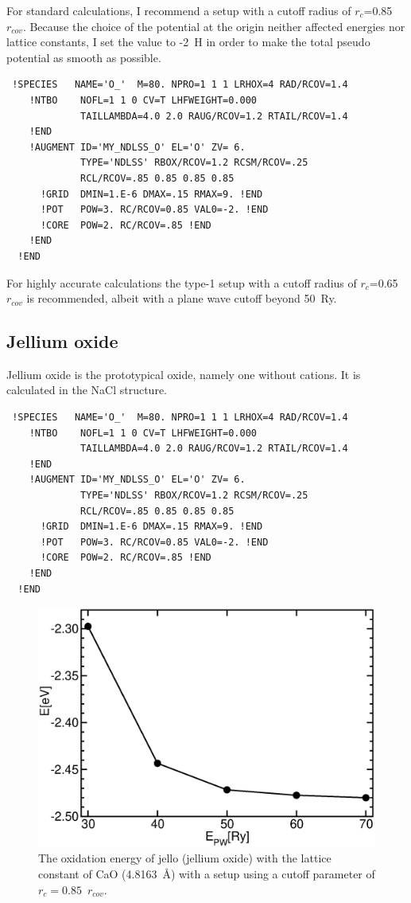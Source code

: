 \documentclass[11pt,a4paper]{report}
\begin{document}
For standard calculations, I recommend a setup with a cutoff radius of
$r_c$=0.85~$r_{cov}$. Because the choice of the potential at the
origin neither affected energies nor lattice constants, I set the
value to -2~H in order to make the total pseudo potential as smooth
as possible.
\begin{verbatim}
 !SPECIES   NAME='O_'  M=80. NPRO=1 1 1 LRHOX=4 RAD/RCOV=1.4
    !NTBO    NOFL=1 1 0 CV=T LHFWEIGHT=0.000
             TAILLAMBDA=4.0 2.0 RAUG/RCOV=1.2 RTAIL/RCOV=1.4 
    !END 
    !AUGMENT ID='MY_NDLSS_O' EL='O' ZV= 6.
             TYPE='NDLSS' RBOX/RCOV=1.2 RCSM/RCOV=.25
             RCL/RCOV=.85 0.85 0.85 0.85
      !GRID  DMIN=1.E-6 DMAX=.15 RMAX=9. !END
      !POT   POW=3. RC/RCOV=0.85 VAL0=-2. !END
      !CORE  POW=2. RC/RCOV=.85 !END
    !END
  !END
\end{verbatim}

 For highly accurate calculations the
type-1 setup with a cutoff radius of $r_c$=0.65~$r_{cov}$ is
recommended, albeit with a plane wave cutoff beyond 50~Ry.


\subsection{Jellium oxide}
Jellium oxide is the prototypical oxide, namely one without
cations. It is calculated in the NaCl structure.
{\tiny\begin{verbatim}
 !SPECIES   NAME='O_'  M=80. NPRO=1 1 1 LRHOX=4 RAD/RCOV=1.4
    !NTBO    NOFL=1 1 0 CV=T LHFWEIGHT=0.000
             TAILLAMBDA=4.0 2.0 RAUG/RCOV=1.2 RTAIL/RCOV=1.4 
    !END 
    !AUGMENT ID='MY_NDLSS_O' EL='O' ZV= 6.
             TYPE='NDLSS' RBOX/RCOV=1.2 RCSM/RCOV=.25
             RCL/RCOV=.85 0.85 0.85 0.85
      !GRID  DMIN=1.E-6 DMAX=.15 RMAX=9. !END
      !POT   POW=3. RC/RCOV=0.85 VAL0=-2. !END
      !CORE  POW=2. RC/RCOV=.85 !END
    !END
  !END
\end{verbatim}}

\begin{figure}[h!]
\begin{center}
\includegraphics[width=0.45\linewidth,clip=true]
{Figs/Jello/eoxjello.eps}
\end{center}
\caption{\label{eoxjello} The oxidation energy of jello (jellium
  oxide) with the lattice constant of CaO (4.8163~\AA) with a setup
  using a cutoff parameter of $r_c=0.85$~$r_{cov}$.  }
\end{figure}
\end{document}
